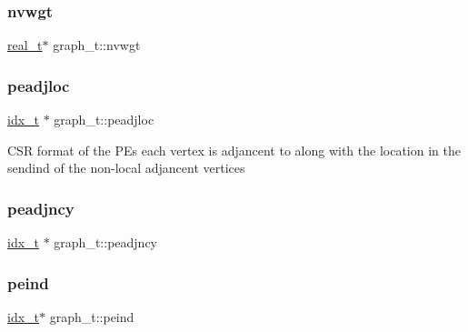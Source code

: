 \mbox{\label{structgraph__t_a470310a35290135cb598717b9959734f}} 
\subsubsection{\texorpdfstring{nvwgt}{nvwgt}}
{\footnotesize\ttfamily \hyperlink{3rd_party_2parmetis-4_80_83_2metis_2include_2metis_8h_a1924a4f6907cc3833213aba1f07fcbe9}{real\+\_\+t}$\ast$ graph\+\_\+t\+::nvwgt}

\mbox{\label{structgraph__t_a86618ecfba6ab3d5c52b15722ba8075e}} 
\subsubsection{\texorpdfstring{peadjloc}{peadjloc}}
{\footnotesize\ttfamily \hyperlink{3rd_party_2parmetis-4_80_83_2metis_2include_2metis_8h_aaa5262be3e700770163401acb0150f52}{idx\+\_\+t} $\ast$ graph\+\_\+t\+::peadjloc}

C\+SR format of the P\+Es each vertex is adjancent to along with the location in the sendind of the non-\/local adjancent vertices \mbox{\label{structgraph__t_aaaddfd8acba59a134963fa72558028fa}} 
\subsubsection{\texorpdfstring{peadjncy}{peadjncy}}
{\footnotesize\ttfamily \hyperlink{3rd_party_2parmetis-4_80_83_2metis_2include_2metis_8h_aaa5262be3e700770163401acb0150f52}{idx\+\_\+t} $\ast$ graph\+\_\+t\+::peadjncy}

\mbox{\label{structgraph__t_acf227509e0b67720938e25ae2936c463}} 
\subsubsection{\texorpdfstring{peind}{peind}}
{\footnotesize\ttfamily \hyperlink{3rd_party_2parmetis-4_80_83_2metis_2include_2metis_8h_aaa5262be3e700770163401acb0150f52}{idx\+\_\+t}$\ast$ graph\+\_\+t\+::peind}


